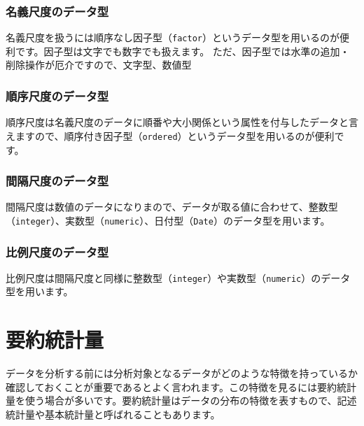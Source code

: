 \documentclass[
  12pt,
]{book}
\begin{document}
\hypertarget{ux540dux7fa9ux5c3aux5ea6ux306eux30c7ux30fcux30bfux578b}{%
\subsubsection{名義尺度のデータ型}\label{ux540dux7fa9ux5c3aux5ea6ux306eux30c7ux30fcux30bfux578b}}

名義尺度を扱うには順序なし因子型（\texttt{factor}）というデータ型を用いるのが便利です。因子型は文字でも数字でも扱えます。 ただ、因子型では水準の追加・削除操作が厄介ですので、文字型、数値型

\hypertarget{ux9806ux5e8fux5c3aux5ea6ux306eux30c7ux30fcux30bfux578b}{%
\subsubsection{順序尺度のデータ型}\label{ux9806ux5e8fux5c3aux5ea6ux306eux30c7ux30fcux30bfux578b}}

順序尺度は名義尺度のデータに順番や大小関係という属性を付与したデータと言えますので、順序付き因子型（\texttt{ordered}）というデータ型を用いるのが便利です。

\hypertarget{ux9593ux9694ux5c3aux5ea6ux306eux30c7ux30fcux30bfux578b}{%
\subsubsection{間隔尺度のデータ型}\label{ux9593ux9694ux5c3aux5ea6ux306eux30c7ux30fcux30bfux578b}}

間隔尺度は数値のデータになりまので、データが取る値に合わせて、整数型（\texttt{integer}）、実数型（\texttt{numeric}）、日付型（\texttt{Date}）のデータ型を用います。

\hypertarget{ux6bd4ux4f8bux5c3aux5ea6ux306eux30c7ux30fcux30bfux578b}{%
\subsubsection{比例尺度のデータ型}\label{ux6bd4ux4f8bux5c3aux5ea6ux306eux30c7ux30fcux30bfux578b}}

比例尺度は間隔尺度と同様に整数型（\texttt{integer}）や実数型（\texttt{numeric}）のデータ型を用います。

\hypertarget{ux8981ux7d04ux7d71ux8a08ux91cf}{%
\section{要約統計量}\label{ux8981ux7d04ux7d71ux8a08ux91cf}}

データを分析する前には分析対象となるデータがどのような特徴を持っているか確認しておくことが重要であるとよく言われます。この特徴を見るには要約統計量を使う場合が多いです。要約統計量はデータの分布の特徴を表すもので、記述統計量や基本統計量と呼ばれることもあります。
\end{document}
